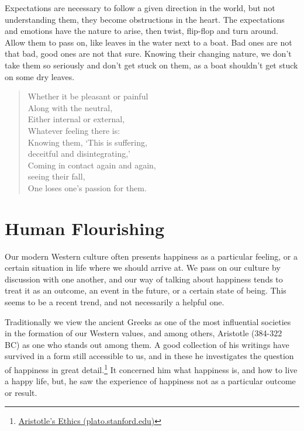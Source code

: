Expectations are necessary to follow a given direction in the world, but
not understanding them, they become obstructions in the heart. The
expectations and emotions have the nature to arise, then twist,
flip-flop and turn around. Allow them to pass on, like leaves in the
water next to a boat. Bad ones are not that bad, good ones are not that
sure. Knowing their changing nature, we don't take them so seriously and
don't get stuck on them, as a boat shouldn't get stuck on some dry
leaves.

\begin{quote}
Whether it be pleasant or painful\\
Along with the neutral,\\
Either internal or external,\\
Whatever feeling there is:\\
Knowing them, `This is suffering,\\
deceitful and disintegrating,'\\
Coming in contact again and again,\\
seeing their fall,\\
One loses one's passion for them.

\bigskip

\end{quote}

\clearpage

\section{Human Flourishing}


Our modern Western culture often presents happiness as a particular
feeling, or a certain situation in life where we should arrive at. We
pass on our culture by discussion with one another, and our way of
talking about happiness tends to treat it as an outcome, an event in the
future, or a certain state of being. This seems to be a recent trend,
and not necessarily a helpful one.

Traditionally we view the ancient Greeks as one of the most influential
societies in the formation of our Western values, and among others,
Aristotle (384-322 BC) as one who stands out among them. A good
collection of his writings have survived in a form still accessible to
us, and in these he investigates the question of happiness in great
detail.\footnote{\href{https://plato.stanford.edu/entries/aristotle-ethics/}{Aristotle's
  Ethics (plato.stanford.edu)}} It concerned him what happiness is, and
how to live a happy life, but, he saw the experience of happiness not as
a particular outcome or result.

